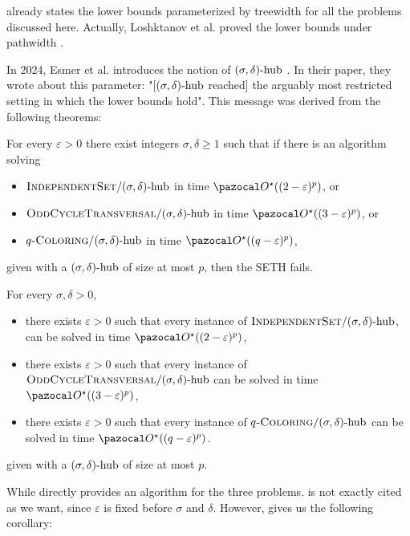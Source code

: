 \medskip

 already states the lower bounds parameterized by treewidth for all the problems discussed here. Actually, Loshktanov et al. proved the lower bounds under pathwidth \cite{lokshtanov2011known}.

In 2024, Esmer et al. introduces the notion of $(\sigma, \delta)\text{-hub}$ \cite{esmer2024fundamental}. In their paper, they wrote about this parameter: "[$(\sigma, \delta)\text{-hub}$ reached] the arguably most restricted setting in which the lower bounds hold". This message was derived from the following theorems:

\begin{theorem}
    \label{theorem:sdhub-lowerbounds}
    For every $\varepsilon > 0$ there exist integers $\sigma, \delta \geq 1$ such that if there is an algorithm solving
    \begin{itemize}
        \item $\textsc{IndependentSet}/(\sigma, \delta)\text{-hub}$ in time $\O^\star((2 - \varepsilon)^p)$, or
        \item $\textsc{OddCycleTransversal}/(\sigma, \delta)\text{-hub}$ in time $\O^\star((3 - \varepsilon)^p)$, or
        \item $q\textsc{-Coloring}/(\sigma, \delta)\text{-hub}$ in time $\O^\star((q - \varepsilon)^p)$,
    \end{itemize}
    given with a $(\sigma, \delta)\text{-hub}$ of size at most $p$, then the SETH fails.
\end{theorem}

\begin{theorem}
    \label{theorem:sdhub-upperbounds}
    For every $\sigma, \delta > 0$, 
    \begin{itemize}
        \item there exists $\varepsilon > 0$ such that every instance of $\textsc{IndependentSet}/(\sigma, \delta)\text{-hub}$, can be solved in time $\O^\star((2 - \varepsilon)^p)$,
        \item there exists $\varepsilon > 0$ such that every instance of $\textsc{OddCycleTransversal}/(\sigma, \delta)\text{-hub}$ can be solved in time $\O^\star((3 - \varepsilon)^p)$,
        \item there exists $\varepsilon > 0$ such that every instance of $q\textsc{-Coloring}/(\sigma, \delta)\text{-hub}$ can be solved in time $\O^\star((q - \varepsilon)^p)$.
    \end{itemize}
    given with a $(\sigma, \delta)\text{-hub}$ of size at most $p$.
\end{theorem}

While  directly provides an algorithm for the three problems.  is not exactly cited as we want, since $\varepsilon$ is fixed before $\sigma$ and $\delta$. However,  gives us the following corollary:

